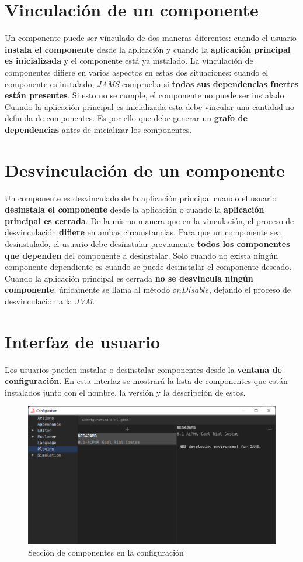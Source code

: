 \section{Vinculación de un componente}\label{sec:vinculacion-de-un-componente}

Un componente puede ser vinculado de dos maneras diferentes:
cuando el usuario \textbf{instala el componente} desde la aplicación
y cuando la \textbf{aplicación principal es inicializada} y el componente
está ya instalado.
La vinculación de componentes difiere en varios aspectos en estas
dos situaciones: cuando el componente es instalado, \textit{JAMS}
comprueba si \textbf{todas sus dependencias fuertes están presentes}.
Si esto no se cumple, el componente no puede ser instalado.
Cuando la aplicación principal es inicializada esta debe vincular
una cantidad no definida de componentes.
Es por ello que debe generar un \textbf{grafo de dependencias}
antes de inicializar los componentes.

\section{Desvinculación de un componente}\label{sec:desvinculacion-de-un-componente}

Un componente es desvinculado de la aplicación principal
cuando el usuario \textbf{desinstala el componente} desde
la aplicación o cuando la \textbf{aplicación principal es cerrada}.
De la misma manera que en la vinculación, el proceso de
desvinculación \textbf{difiere} en ambas circunstancias.
Para que un componente sea desinstalado, el usuario
debe desinstalar previamente \textbf{todos los componentes
que dependen} del componente a desinstalar.
Solo cuando no exista ningún componente dependiente
es cuando se puede desinstalar el componente deseado.
Cuando la aplicación principal es cerrada
\textbf{no se desvincula ningún componente},
únicamente se llama al método $onDisable$, dejando
el proceso de desvinculación a la \textit{JVM}.

\section{Interfaz de usuario}\label{sec:interfaz-de-usuario}

Los usuarios pueden instalar o desinstalar componentes
desde la \textbf{ventana de configuración}.
En esta interfaz se mostrará la lista de componentes
que están instalados junto con el nombre, la versión
y la descripción de estos.

\begin{figure}[h]
    \centering
    \includegraphics[width=\textwidth]{images/componentes/plugin-ui}
    \caption{Sección de componentes en la configuración}
    \label{fig:plugin-ui}
\end{figure}